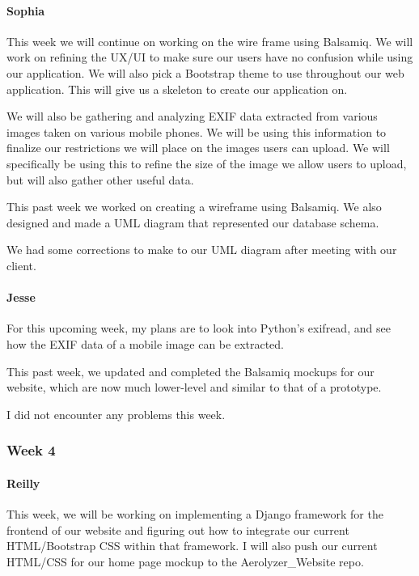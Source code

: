 \documentclass[onecolumn, draftclsnofoot,10pt, compsoc]{IEEEtran}
\begin{document}
\begin{flushleft}
\paragraph{Sophia}
 
This week we will continue on working on the wire frame using Balsamiq. We will work on refining the UX/UI to make sure our users have no confusion while using our application. We will also pick a Bootstrap theme to use throughout our web application. This will give us a skeleton to create our application on.
 
We will also be gathering and analyzing EXIF data extracted from various images taken on various mobile phones. We will be using this information to finalize our restrictions we will place on the images users can upload. We will specifically be using this to refine the size of the image we allow users to upload, but will also gather other useful data.
 
 
This past week we worked on creating a wireframe using Balsamiq. We also designed and made a UML diagram that represented our database schema.
 
 
We had some corrections to make to our UML diagram after meeting with our client.
 
\paragraph{Jesse}
 
For this upcoming week, my plans are to look into Python's exifread, and see how the EXIF data of a mobile image can be extracted.
 
 
This past week, we updated and completed the Balsamiq mockups for our website, which are now much lower-level and similar to that of a prototype.
 
 
I did not encounter any problems this week.
 
 
\subsubsection{Week 4}
\paragraph{Reilly}
 
This week, we will be working on implementing a Django framework for the frontend of our website and figuring out how to integrate our current HTML/Bootstrap CSS within that framework. I will also push our current HTML/CSS for our home page mockup to the Aerolyzer\_Website repo.
 

\end{flushleft}
\end{document}
